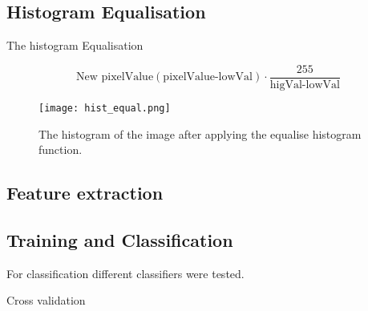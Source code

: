 \subsection{Histogram Equalisation}
The histogram Equalisation

\begin{equation}\label{eq:hist_stretch}
	\text{New~pixelValue} (\text{pixelValue-lowVal})\cdot\frac{255}{\text{higVal-lowVal}}
\end{equation}


\begin{figure}[h]
\centering
\texttt{[image: hist\_equal.png]}
\caption{The histogram of the image after applying the equalise histogram function.}
\label{fig:histEq}
\end{figure}

\subsection{Feature extraction}


\subsection{Training and Classification}
For classification different classifiers were tested. 




Cross validation




